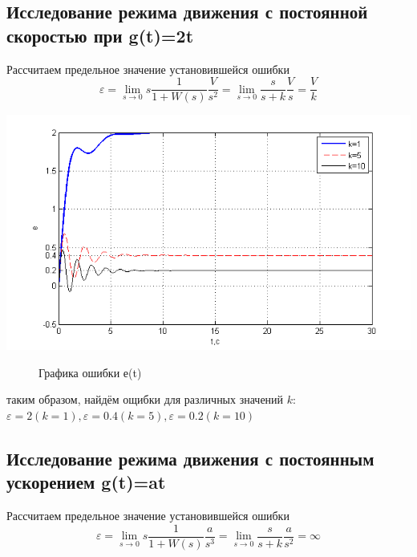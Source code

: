 \documentclass[a4paper, 10pt]{article}
\begin{document}
\subsection{Исследование режима движения с постоянной скоростью при g(t)=2t}\hfill\par
Рассчитаем предельное значение установившейся ошибки
\begin{equation}
\varepsilon  = \mathop {\lim }\limits_{s \to 0} s\frac{1}{{1 + W(s)}}\frac{V}{{{s^2}}} = \mathop {\lim }\limits_{s \to 0} \frac{s}{{s + k}}\frac{V}{s} = \frac{V}{k}
\end{equation}



\begin{center}
	\includegraphics[width=0.7\linewidth]{6}
	\begin{figure}[h]
		\centering
		
		\caption{Графика ошибки е(t)}
		\label{fig:6}
	\end{figure}
\end{center}

таким образом, найдём ощибки для различных значений $k$:
$\varepsilon=2 (k=1), \varepsilon=0.4 (k=5), \varepsilon=0.2 (k=10)$

\subsection{Исследование режима движения с постоянным ускорением g(t)=at}\hfill\par

Рассчитаем предельное значение установившейся ошибки
\begin{equation}
\varepsilon  = \mathop {\lim }\limits_{s \to 0} s\frac{1}{{1 + W(s)}}\frac{a}{{{s^3}}} = \mathop {\lim }\limits_{s \to 0} \frac{s}{{s + k}}\frac{a}{{{s^2}}} = \infty
\end{equation}
\end{document}

